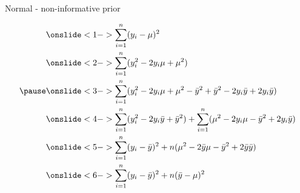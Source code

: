 \documentclass[finnish,english,t]{beamer}
\begin{document}
\begin{frame}{Normal - non-informative prior}
  
  \vspace{-1.5\baselineskip} 
 \begin{align*}
   &\onslide<1->{\sum_{i=1}^n(y_i-\mu)^2}\\
   &\onslide<2->{\sum_{i=1}^n(y_i^2-2 y_i \mu + \mu^2)}\\
\pause
   &\onslide<3->{\sum_{i=1}^n(y_i^2-2 y_i \mu + \mu^2 -\bar{y}^2 + \bar{y}^2 - 2 y_i \bar{y} + 2 y_i \bar{y})}\\
   &\onslide<4->{\sum_{i=1}^n(y_i^2-2 y_i \bar{y} + \bar{y}^2) + \sum_{i=1}^n(\mu^2 - 2 y_i \mu -\bar{y}^2  + 2 y_i \bar{y})}\\
   &\onslide<5->{\sum_{i=1}^n(y_i-\bar{y})^2 + n(\mu^2 -  2\bar{y}\mu -\bar{y}^2  + 2 \bar{y}\bar{y})}\\
   &\onslide<6->{\sum_{i=1}^n(y_i-\bar{y})^2 + n(\bar{y}-\mu)^2}
 \end{align*}

\end{frame}
\end{document}
